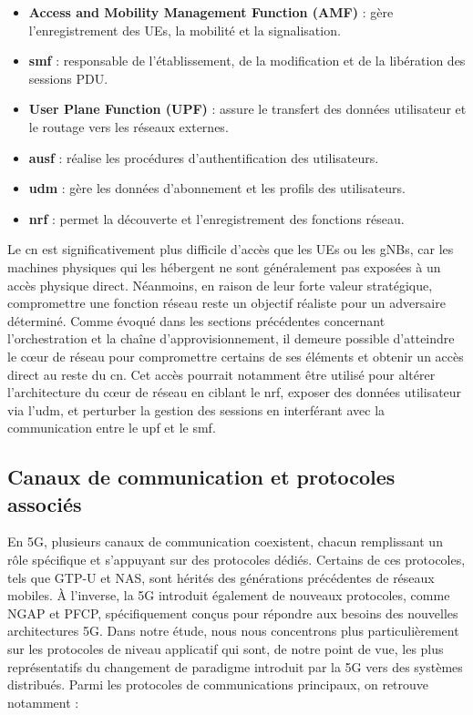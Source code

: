 \documentclass[a4paper,11pt,twoside]{StyleThese}
\begin{document}
\begin{itemize}
\item \textbf{Access and Mobility Management Function (AMF)} : gère l’enregistrement des UEs, la mobilité et la signalisation.
\item \textbf{\gls{smf}} : responsable de l’établissement, de la modification et de la libération des sessions PDU.
\item \textbf{User Plane Function (UPF)} : assure le transfert des données utilisateur et le routage vers les réseaux externes.
\item \textbf{\gls{ausf}} : réalise les procédures d’authentification des utilisateurs.
\item \textbf{\gls{udm}} : gère les données d’abonnement et les profils des utilisateurs.
\item \textbf{\gls{nrf}} : permet la découverte et l’enregistrement des fonctions réseau.
\end{itemize}

Le \gls{cn} est significativement plus difficile d’accès que les UEs ou les gNBs, car les machines physiques qui les hébergent ne sont généralement pas exposées à un accès physique direct. Néanmoins, en raison de leur forte valeur stratégique, compromettre une fonction réseau reste un objectif réaliste pour un adversaire déterminé. Comme évoqué dans les sections précédentes concernant l’orchestration et la chaîne d’approvisionnement, il demeure possible d’atteindre le cœur de réseau pour compromettre certains de ses éléments et obtenir un accès direct au reste du \gls{cn}. Cet accès pourrait notamment être utilisé pour altérer l’architecture du cœur de réseau en ciblant le \gls{nrf}\cite{5gad}, exposer des données utilisateur via l'\gls{udm}\cite{5gad}, et perturber la gestion des sessions en interférant avec la communication entre le \gls{upf} et le \gls{smf}\cite{pfcp1}.

\subsection{Canaux de communication et protocoles associés}
En 5G, plusieurs canaux de communication coexistent, chacun remplissant un rôle spécifique et s’appuyant sur des protocoles dédiés. Certains de ces protocoles, tels que GTP-U et NAS, sont hérités des générations précédentes de réseaux mobiles. À l’inverse, la 5G introduit également de nouveaux protocoles, comme NGAP et PFCP, spécifiquement conçus pour répondre aux besoins des nouvelles architectures 5G. Dans notre étude, nous nous concentrons plus particulièrement sur les protocoles de niveau applicatif qui sont, de notre point de vue, les plus représentatifs du changement de paradigme introduit par la 5G vers des systèmes distribués. Parmi les protocoles de communications principaux, on retrouve notamment :
\end{document}
